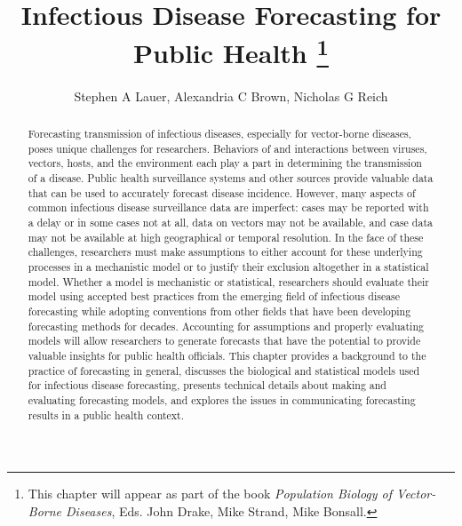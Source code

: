 \documentclass[a4paper]{article}
\title{Infectious Disease Forecasting for Public Health
\footnote{This chapter will appear as part of the book {\em Population Biology of Vector-Borne Diseases}, Eds. John Drake, Mike Strand, Mike Bonsall.}}
\author{Stephen A Lauer, Alexandria C Brown, Nicholas G Reich}
\begin{document}
\maketitle

\begin{abstract}
Forecasting transmission of infectious diseases, especially for vector-borne diseases, poses unique challenges for researchers.
Behaviors of and interactions between viruses, vectors, hosts, and the environment each play a part in determining the transmission of a disease.
Public health surveillance systems and other sources provide valuable data that can be used to accurately forecast disease incidence. 
However, many aspects of common infectious disease surveillance data are imperfect: cases may be reported with a delay or in some cases not at all, data on vectors may not be available, and case data may not be available at high geographical or temporal resolution.
In the face of these challenges, researchers must make assumptions to either account for these underlying processes in a mechanistic model or to justify their exclusion altogether in a statistical model.
Whether a model is mechanistic or statistical, researchers should evaluate their model using accepted best practices from the emerging field of infectious disease forecasting while adopting conventions from other fields that have been developing forecasting methods for decades.
Accounting for assumptions and properly evaluating models will allow researchers to generate forecasts that have the potential to provide  valuable insights for public health officials.
This chapter provides a background to the practice of forecasting in general, discusses the biological and statistical models used for infectious disease forecasting, presents technical details about making and evaluating forecasting models, and explores the issues in communicating forecasting results in a public health context.
\end{abstract}

\vfill

\doclicenseThis

\clearpage 

\tableofcontents

\clearpage
\end{document}
